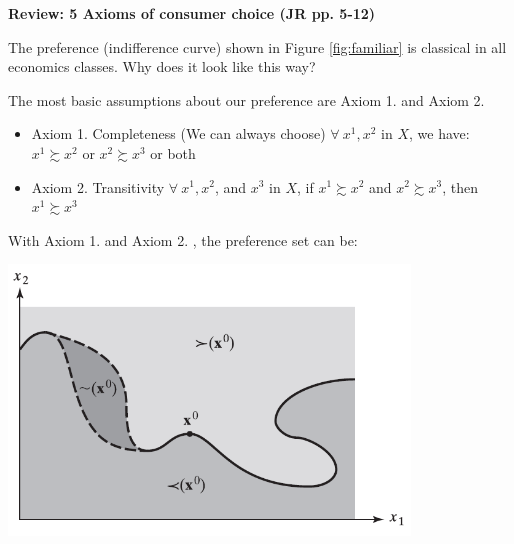 \documentclass{article}
\begin{document}
\begin{mdframed}[backgroundcolor=blue!20,linecolor=white] 

\textbf{Review: 5 Axioms of consumer choice (JR pp. 5-12)}

\vspace{2mm}

The preference (indifference curve) shown in Figure \ref{fig:familiar} is classical in all
economics classes. Why does it look like this way?

\vspace{2mm}

{\centering
{}
\label{fig:familiar}}
\vspace{2mm}

The most basic assumptions about our preference are Axiom 1.  and Axiom 2. 

\begin{itemize}
\item Axiom 1. Completeness (We can always choose)
$\forall \ x^1, x^2$ in $X$, we have: $x^1 \succsim  x^2$ or $x^2 \succsim  x^3$  or both
\item Axiom 2. Transitivity
$\forall \ x^1, x^2$, and  $x^3$ in $X$, if $x^1 \succsim  x^2$ and $x^2 \succsim  x^3$, then $x^1 \succsim  x^3$
\end{itemize}

With Axiom 1. and Axiom 2. , the preference set can be:

\vspace{2mm}

{\centering
\includegraphics[width=0.8\textwidth]{1.open}
\label{open}}
\vspace{2mm}


\end{mdframed}
\end{document}
